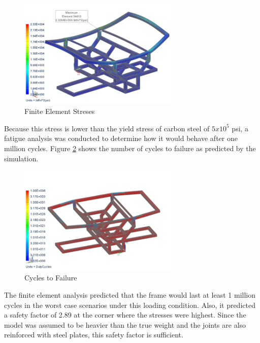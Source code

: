 \begin{figure}[H]
\begin{center}
\includegraphics[width=3in]{./Pics/Stress.png}
\caption{Finite Element Streses}
\label{FIG:stress}
\end{center}
\end{figure}

Because this stress is lower than the yield stress of carbon steel of $5x10^5$ psi, a fatigue analysis was conducted to determine how it would behave after one million cycles. Figure \ref{FIG:cycles} shows the number of cycles to failure as predicted by the simulation.

\begin{figure}[H]
\begin{center}
\includegraphics[width=3in]{./Pics/Cycles.png}
\caption{Cycles to Failure}
\label{FIG:cycles}
\end{center}
\end{figure}

The finite element analysis predicted that the frame would last at least 1 million cycles in the worst case scenarios under this loading condition. Also, it predicted a safety factor of 2.89 at the corner where the stresses were highest. Since the model was assumed to be heavier than the true weight and the joints are also reinforced with steel plates, this safety factor is sufficient.


